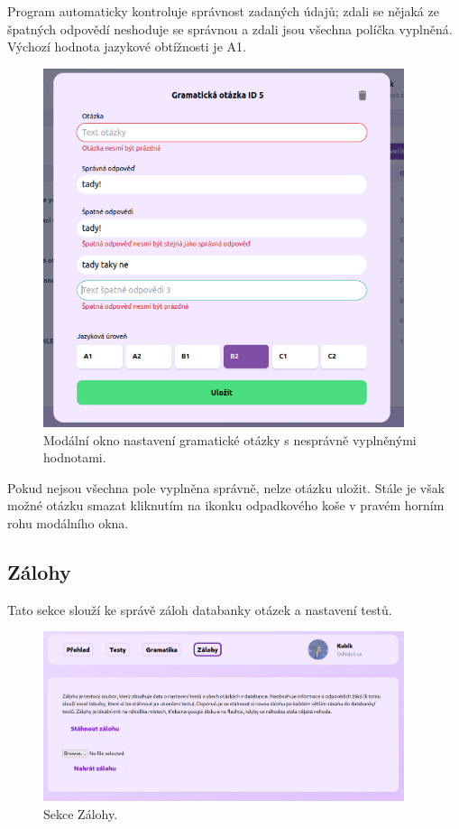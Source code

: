 Program automaticky kontroluje správnost zadaných údajů; zdali se nějaká ze špatných odpovědí neshoduje se správnou a zdali jsou všechna políčka vyplněná. Výchozí hodnota jazykové obtížnosti je A1.

\begin{figure}[H]
    \centering
    \includegraphics[width=400px]{images/01design/question-bad.png}
    \caption{Modální okno nastavení gramatické otázky s nesprávně vyplněnými hodnotami.}
\end{figure}

Pokud nejsou všechna pole vyplněna správně, nelze otázku uložit. Stále je však možné otázku smazat kliknutím na ikonku odpadkového koše v pravém horním rohu modálního okna.

\pagebreak
\subsection{Zálohy}

Tato sekce slouží ke správě záloh databanky otázek a nastavení testů. 

\begin{figure}[H]
    \centering
    \includegraphics[width=400px]{images/01design/backup.png}
    \caption{Sekce Zálohy.}
\end{figure}

